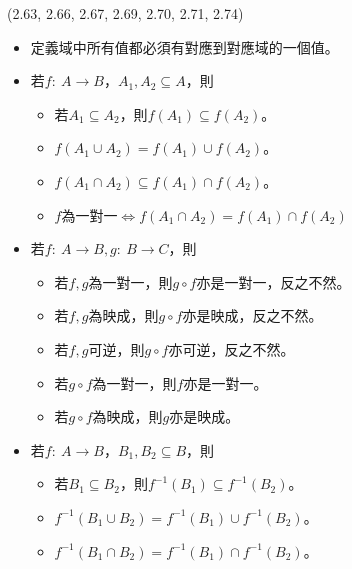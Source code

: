 \item \begin{theorem}{(2.63, 2.66, 2.67, 2.69, 2.70, 2.71, 2.74)} \quad\quad
    \begin{itemize}
        \item 定義域中所有值都必須有對應到對應域的一個值。
        \item 若$f: \ A \rightarrow B$，$A_1, A_2 \subseteq A$，則
            \begin{itemize}
                \item 若$A_1 \subseteq A_2$，則$f(A_1) \subseteq f(A_2)$。
                \item $f(A_1 \cup A_2) = f(A_1) \cup f(A_2)$。
                \item $f(A_1 \cap A_2) \subseteq f(A_1) \cap f(A_2)$。
                \item $f$為一對一$\iff$$f(A_1 \cap A_2) = f(A_1) \cap f(A_2)$
            \end{itemize}
        \item 若$f: \ A \rightarrow B, g: \ B \rightarrow C$，則
            \begin{itemize}
                \item 若$f, g$為一對一，則$g \circ f$亦是一對一，反之不然。
                \item 若$f, g$為映成，則$g \circ f$亦是映成，反之不然。
                \item 若$f, g$可逆，則$g \circ f$亦可逆，反之不然。
                \item 若$g \circ f$為一對一，則$f$亦是一對一。
                \item 若$g \circ f$為映成，則$g$亦是映成。
            \end{itemize}
        \item 若$f: \ A \rightarrow B$，$B_1, B_2 \subseteq B$，則
            \begin{itemize}
                \item 若$B_1 \subseteq B_2$，則$f^{-1}(B_1) \subseteq f^{-1}(B_2)$。
                \item $f^{-1}(B_1 \cup B_2) = f^{-1}(B_1) \cup f^{-1}(B_2)$。
                \item $f^{-1}(B_1 \cap B_2) = f^{-1}(B_1) \cap f^{-1}(B_2)$。
            \end{itemize}
    \end{itemize}
\end{theorem}

